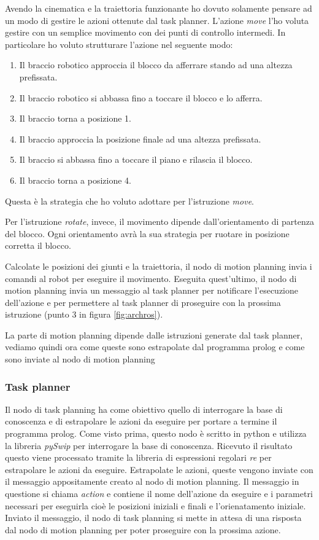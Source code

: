 Avendo la cinematica e la traiettoria funzionante ho dovuto solamente pensare ad un modo di gestire le azioni ottenute dal task planner. L'azione \textit{move} l'ho voluta gestire con un semplice movimento con dei punti di controllo intermedi. In particolare ho voluto strutturare l'azione nel seguente modo:
\begin{enumerate}
    \item Il braccio robotico approccia il blocco da afferrare stando ad una altezza prefissata.
    \item Il braccio robotico si abbassa fino a toccare il blocco e lo afferra.
    \item Il braccio torna a posizione 1.
    \item Il braccio approccia la posizione finale ad una altezza prefissata.
    \item Il braccio si abbassa fino a toccare il piano e rilascia il blocco.
    \item Il braccio torna a posizione 4.
\end{enumerate}
Questa è la strategia che ho voluto adottare per l'istruzione \textit{move}.

Per l'istruzione \textit{rotate}, invece, il movimento dipende dall'orientamento di partenza del blocco. 
Ogni orientamento avrà la sua strategia per ruotare in posizione corretta il blocco.

Calcolate le posizioni dei giunti e la traiettoria, il nodo di motion planning invia i comandi al robot per eseguire il movimento.
Eseguita quest'ultimo, il nodo di motion planning invia un messaggio al task planner per notificare l'esecuzione dell'azione e per permettere al task planner di proseguire con la prossima istruzione (punto 3 in figura \ref{fig:archros}).

La parte di motion planning dipende dalle istruzioni generate dal task planner, vediamo quindi ora come queste sono estrapolate dal programma prolog e come sono inviate al nodo di motion planning
\subsubsection{Task planner}
\label{subsubsec:taskplanner}
Il nodo di task planning ha come obiettivo quello di interrogare la base di conoscenza e di estrapolare le azioni da eseguire per portare a termine il programma prolog.
Come visto prima, questo nodo è scritto in python e utilizza la libreria \textit{pySwip} per interrogare la base di conoscenza. 
Ricevuto il risultato questo viene processato tramite la libreria di espressioni regolari \textit{re} per estrapolare le azioni da eseguire. 
Estrapolate le azioni, queste vengono inviate con il messaggio appositamente creato al nodo di motion planning. Il messaggio in questione si chiama \textit{action} e contiene il nome dell'azione da eseguire e i parametri necessari per eseguirla cioè le posizioni iniziali e finali e l'orienatamento iniziale.
Inviato il messaggio, il nodo di task planning si mette in attesa di una risposta dal nodo di motion planning per poter proseguire con la prossima azione.

